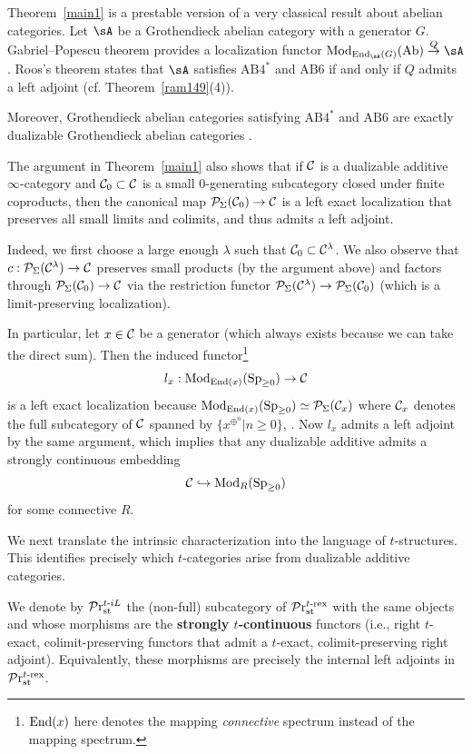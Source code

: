 \documentclass[a4paper,10pt, oneside]{amsart}
\begin{document}
	\begin{rem}\label{rem:Roos}
		Theorem~\ref{main1} is a prestable version of a very classical result about abelian categories. 
		Let $\sA$ be a Grothendieck abelian category with a generator $G$. Gabriel--Popescu theorem provides a localization functor $\mathrm{Mod}_{\op{End}_{\sA}(G)}(\op{Ab}) \stackrel{Q}\to \sA$. 
		Roos's theorem \cite{Roos1965} states that $\sA$ satisfies $\mathrm{AB4}^*$ and $\mathrm{AB6}$ if and only if $Q$ admits a left adjoint (cf. Theorem~\ref{ram149}(4)). 
		
		Moreover, Grothendieck abelian categories satisfying $\mathrm{AB4}^*$ and $\mathrm{AB6}$ are exactly dualizable Grothendieck abelian categories 
		\cite[Corollary~3.7]{kanda2024moduletheoreticapproachdualizablegrothendieck}.
	\end{rem}

	\begin{rem}\label{embedmodcat}
	The argument in Theorem~\ref{main1} also shows that if $\mathcal{C}$ is a dualizable additive $\infty$-category and $\mathcal{C}_0 \subset \mathcal{C}$ is a small $0$-generating subcategory closed under finite coproducts, then the canonical map $\mathcal{P}_\Sigma(\mathcal{C}_0) \to \mathcal{C}$ is a left exact localization that preserves all small limits and colimits, and thus admits a left adjoint.
		
		Indeed, we first choose a large enough $\lambda$ such that $\mathcal{C}_0\subset\mathcal{C}^\lambda$. We also observe that $c:\mathcal{P}_\Sigma(\mathcal{C}^{\lambda})\to\mathcal{C}$ preserves small products (by the argument above) and factors through  $\mathcal{P}_\Sigma(\mathcal{C}_0)\to\mathcal{C}$ via the restriction functor $\mathcal{P}_\Sigma(\mathcal{C}^{\lambda})\to \mathcal{P}_\Sigma(\mathcal{C}_0)$ (which is a limit-preserving localization).
		
		In particular, let $x\in \mathcal{C}$ be a generator (which always exists because we can take the direct sum). Then the induced functor\footnote{$\mathrm{End}(x)$ here denotes the mapping \emph{connective} spectrum instead of the mapping spectrum.} $$l_x: \operatorname{Mod}_{\mathrm{End}(x)}(\operatorname{Sp}_{\geq0})\to \mathcal{C}$$  is a left exact localization  because $\operatorname{Mod}_{\mathrm{End}(x)}(\operatorname{Sp}_{\geq0})\simeq \mathcal{P}_\Sigma(\mathcal{C}_x)$ where $\mathcal{C}_x$ denotes the full subcategory of $\mathcal{C}$ spanned by $\{x^{\oplus^n}|n\geq 0\}$, \cite[see][Remark C.2.1.9]{sag}. Now  $l_x$ admits a left adjoint by the same argument, which implies that any dualizable additive \infcat \mcc admits a strongly continuous embedding $$\mathcal{C}\hookrightarrow\operatorname{Mod}_{R}(\operatorname{Sp}_{\geq0})$$ for some connective \eonering $R$.
	\end{rem}
	We next translate the intrinsic characterization into the language of $t$-structures. This identifies precisely which $t$-categories arise from dualizable additive categories.
\begin{de}\label{de:strongly_cocont}
	We denote by $\mathcal{P}\mathrm{r}^{t\text{-}iL}_{\mathrm{st}}$ the (non-full) subcategory of $\mathcal{P}\mathrm{r}^{t\text{-rex}}_{\mathrm{st}}$ with the same objects and whose morphisms are the \textbf{strongly $t$-continuous} functors (i.e., right $t$-exact, colimit-preserving functors that admit a $t$-exact, colimit-preserving right adjoint). Equivalently, these morphisms are precisely the internal left adjoints in $\mathcal{P}\mathrm{r}^{t\text{-rex}}_{\mathrm{st}}$.
\end{de}
\end{document}
